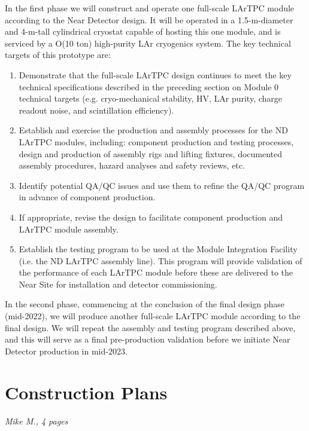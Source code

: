 In the first phase we will construct and operate one full-scale LArTPC module according to the Near Detector design.  
It will be operated in a 1.5-m-diameter and 4-m-tall cylindrical cryostat capable of hosting this one module, and is serviced by a O(10 ton) high-purity LAr cryogenics system.  
The key technical targets of this prototype are:
\begin{enumerate}
    \item Demonstrate that the full-scale LArTPC design continues to meet the key technical specifications described in the preceding section on Module 0 technical targets (e.g. cryo-mechanical stability, HV, LAr purity, charge readout noise, and scintillation efficiency).
    \item Establish and exercise the production and assembly processes for the ND LArTPC modules, including: component production and testing processes, design and production of assembly rigs and lifting fixtures, documented assembly procedures, hazard analyses and safety reviews, etc.
    \item Identify potential QA/QC issues and use them to refine the QA/QC program in advance of component production.
    \item If appropriate, revise the design to facilitate component production and LArTPC module assembly.
    \item Establish the testing program to be used at the Module Integration Facility (i.e. the ND LArTPC assembly line).  This program will provide validation of the performance of each LArTPC module before these are delivered to the Near Site for installation and detector commissioning. 
\end{enumerate}

In the second phase, commencing at the conclusion of the final design phase (mid-2022), we will produce another full-scale LArTPC module according to the final design.  
We will repeat the assembly and testing program described above, and this will serve as a final pre-production validation before we initiate Near Detector production in mid-2023.

\section{Construction Plans}
\label{sec:lartpc-construc}
{\it Mike M., 4 pages}

